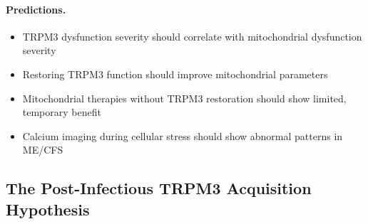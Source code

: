 \paragraph{Predictions.}
\begin{itemize}
    \item TRPM3 dysfunction severity should correlate with mitochondrial dysfunction severity
    \item Restoring TRPM3 function should improve mitochondrial parameters
    \item Mitochondrial therapies without TRPM3 restoration should show limited, temporary benefit
    \item Calcium imaging during cellular stress should show abnormal patterns in ME/CFS
\end{itemize}

\subsection{The Post-Infectious TRPM3 Acquisition Hypothesis}

